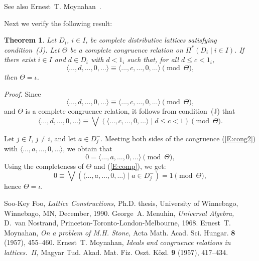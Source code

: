 \documentclass{article}
\newtheorem{theorem}{Theorem}
\begin{document}
See also Ernest~T. Moynahan~\cite{eM57a}.

Next we verify the following result:

\begin{theorem}\label{T:P*} 
    Let $D_{i}$, $i \in I$, be complete distributive 
   lattices satisfying condition~\textup{(J)}.  Let $\Theta$
   be a complete congruence relation on 
   $\Pi^{*} ( D_{i} \mid i \in I )$. 
   If there exist $i \in I$ and $d \in D_{i}$ with 
   $d < 1_{i}$ such that, for all $d \leq c < 1_{i}$, 
   \begin{equation}\label{E:cong1} 
      \langle \ldots, d, \ldots, 0, \ldots \rangle \equiv 
      \langle \ldots, c, \ldots, 0, \ldots \rangle \pmod{\Theta}, 
   \end{equation}
   then $\Theta = \iota$.
\end{theorem}

\emph{Proof.} Since 
\begin{equation}\label{E:cong2}
   \langle \ldots, d, \ldots, 0, \ldots \rangle \equiv 
   \langle \ldots, c, \ldots, 0, \ldots \rangle \pmod{\Theta}, 
\end{equation}
and $\Theta$ is a complete congruence relation, it follows 
from condition~(J) that
\begin{equation}\label{E:cong}
    \langle \ldots, d, \ldots, 0, \ldots \rangle \equiv
    \bigvee ( \langle \ldots, c, \ldots, 0, \ldots \rangle 
    \mid d \leq c < 1 ) \pmod{\Theta}. 
\end{equation}

Let $j \in I$, $j \neq i$, and let $a \in D_{j}^{-}$. 
Meeting both sides of the congruence (\ref{E:cong2}) with 
$\langle \ldots, a, \ldots, 0, \ldots \rangle$, we obtain that
\begin{equation}\label{E:comp}
   0 = \langle \ldots, a, \ldots, 0, \ldots \rangle \pmod{\Theta}, 
\end{equation}
Using the completeness of $\Theta$ and (\ref{E:comp}), 
we get:
\[
   0 \equiv \bigvee ( \langle \ldots, a, \ldots, 0, \ldots \rangle 
   \mid a \in D_{j}^{-} ) = 1 \pmod{\Theta}, 
\]
hence $\Theta = \iota$.

\begin{thebibliography}{9}
      Soo-Key Foo, 
      \emph{Lattice Constructions,} 
      Ph.D. thesis, 
      University of Winnebago, Winnebago, MN, December, 1990.
      George~A. Menuhin, 
      \emph{Universal Algebra,} 
      D.~van Nostrand, Princeton-Toronto-London-Melbourne, 1968.
      Ernest~T. Moynahan, 
      \emph{On a problem of M.H. Stone,}
      Acta Math. Acad. Sci. Hungar. \textbf{8} (1957), 455--460.
      Ernest~T. Moynahan, 
      \emph{Ideals and congruence relations in lattices.~II,} 
      Magyar Tud. Akad. Mat. Fiz. Oszt. K\"{o}zl. \textbf{9} 
      (1957), 417--434.
\end{thebibliography}
\end{document}

